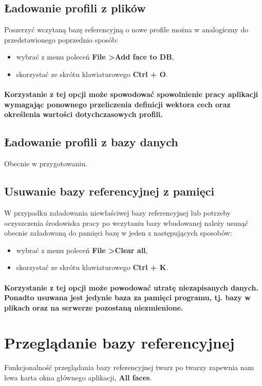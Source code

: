 \documentclass[]{article}
\begin{document}
\subsection{Ładowanie profili z plików}
Poszerzyć wczytaną bazę referencyjną o nowe profile można w analogiczny do przedstawionego poprzednio sposób:
\begin{itemize}
	\item wybrać z menu poleceń \textbf{File \textgreater \space Add face to DB},
	\item skorzystać ze skrótu klawiaturowego \textbf{Ctrl + O}.
\end{itemize}
\paragraph*{Korzystanie z tej opcji może spowodować spowolnienie pracy aplikacji wymagając ponownego przeliczenia definicji wektora cech oraz określenia wartości dotychczasowych profili.}

\subsection{Ładowanie profili z bazy danych}
Obecnie w przygotowaniu.

\subsection{Usuwanie bazy referencyjnej z pamięci}
W przypadku załadowania niewłaściwej bazy referencyjnej lub potrzeby oczyszczenia środowiska pracy po wczytaniu bazy wbudowanej należy usunąć obecnie załadowaną do pamięci bazę w jeden z następujących sposobów:
\begin{itemize}
	\item wybrać z menu poleceń \textbf{File \textgreater \space Clear all},
	\item skorzystać ze skrótu klawiaturowego \textbf{Ctrl + K}.
\end{itemize}
\paragraph*{Korzystanie z tej opcji może powodować utratę niezapisanych danych. Ponadto usuwana jest jedynie baza za pamięci programu, tj. bazy w plikach oraz na serwerze pozostaną niezmienione.}




\section[Przeglądanie bazy]{Przeglądanie bazy referencyjnej}
\label{sec:view}
Funkcjonalność przeglądania bazy referencyjnej twarz po twarzy zapewnia nam lewa karta okna głównego aplikacji, \textbf{All faces}.
\end{document}
